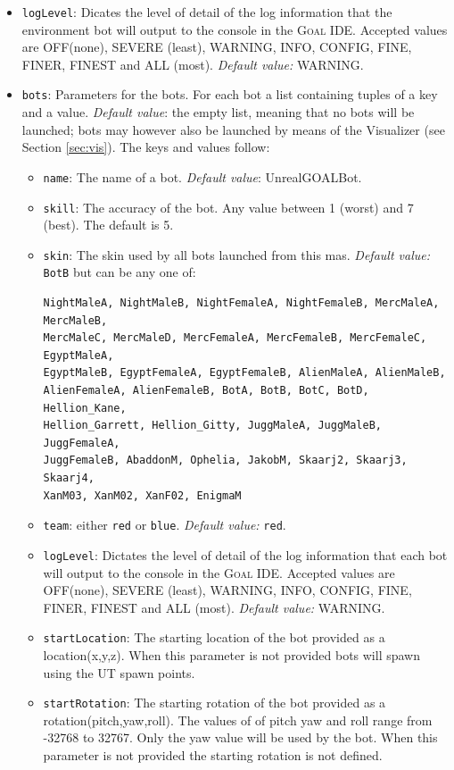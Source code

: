 \documentclass[11pt,a4paper]{article}
\newcommand{\Goal}{\textsc{Goal}}
\begin{document}
\begin{itemize}
	\item \texttt{logLevel}: Dicates the level of detail of the log information that the environment bot will output to the console in the {\Goal} IDE.  Accepted values are \textsc{OFF}(none), \textsc{SEVERE} (least), \textsc{WARNING}, \textsc{INFO}, \textsc{CONFIG}, \textsc{FINE}, \textsc{FINER}, \textsc{FINEST} and \textsc{ALL} (most). \textit{Default value:} \textsc{WARNING}.
	\item \texttt{bots}: Parameters for the bots. For each bot a list containing tuples of a key and a value. \textit{Default value}: the empty list, meaning that no bots will be launched; bots may however also be launched by means of the Visualizer (see Section \ref{sec:vis}). The keys and values follow:
\begin{itemize}
	\item \texttt{name}: The name of a bot. \textit{Default value}: UnrealGOALBot.
	\item \texttt{skill}: The accuracy of the bot. Any value between 1 (worst) and 7 (best). The default is 5.
	\item \texttt{skin}: The skin used by all bots launched from this mas. \textit{Default value:} \texttt{BotB} but can be any one of:
\begin{verbatim}
NightMaleA, NightMaleB, NightFemaleA, NightFemaleB, MercMaleA, MercMaleB,
MercMaleC, MercMaleD, MercFemaleA, MercFemaleB, MercFemaleC, EgyptMaleA,
EgyptMaleB, EgyptFemaleA, EgyptFemaleB, AlienMaleA, AlienMaleB,
AlienFemaleA, AlienFemaleB, BotA, BotB, BotC, BotD, Hellion_Kane,
Hellion_Garrett, Hellion_Gitty, JuggMaleA, JuggMaleB, JuggFemaleA,
JuggFemaleB, AbaddonM, Ophelia, JakobM, Skaarj2, Skaarj3, Skaarj4,
XanM03, XanM02, XanF02, EnigmaM
\end{verbatim}
	\item \texttt{team}: either \texttt{red} or \texttt{blue}. \textit{Default value:} \texttt{red}.
	\item \texttt{logLevel}: Dictates the level of detail of the log information that each bot will output to the console in the {\Goal} IDE.  Accepted values are \textsc{OFF}(none), \textsc{SEVERE} (least), \textsc{WARNING}, \textsc{INFO}, \textsc{CONFIG}, \textsc{FINE}, \textsc{FINER}, \textsc{FINEST} and \textsc{ALL} (most). \textit{Default value:} \textsc{WARNING}.
	\item \texttt{startLocation}: The starting location of the bot provided as a location(x,y,z). When this parameter is not provided bots will spawn using the UT spawn points.
	\item \texttt{startRotation}: The starting rotation of the bot provided as a rotation(pitch,yaw,roll). The values of of pitch yaw and roll range from -32768 to 32767. Only the yaw value will be used by the bot.  When this parameter is not provided the starting rotation is not defined.
\end{itemize}
	
\end{itemize}
\end{document}
